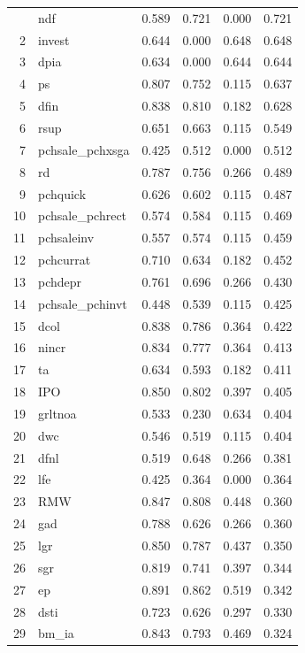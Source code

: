 \begin{footnotesize}
\begin{longtable}{rl|c|c|c|c}
		
		\hline\hline
		\endfoot
		1 & ndf & 0.589 & 0.721 & 0.000 & 0.721 \\ 
		2 & invest & 0.644 & 0.000 & 0.648 & 0.648 \\ 
		3 & dpia & 0.634 & 0.000 & 0.644 & 0.644 \\ 
		4 & ps & 0.807 & 0.752 & 0.115 & 0.637 \\ 
		5 & dfin & 0.838 & 0.810 & 0.182 & 0.628 \\ 
		6 & rsup & 0.651 & 0.663 & 0.115 & 0.549 \\ 
		7 & pchsale\_pchxsga & 0.425 & 0.512 & 0.000 & 0.512 \\ 
		8 & rd & 0.787 & 0.756 & 0.266 & 0.489 \\ 
		9 & pchquick & 0.626 & 0.602 & 0.115 & 0.487 \\ 
		10 & pchsale\_pchrect & 0.574 & 0.584 & 0.115 & 0.469 \\ 
		11 & pchsaleinv & 0.557 & 0.574 & 0.115 & 0.459 \\ 
		12 & pchcurrat & 0.710 & 0.634 & 0.182 & 0.452 \\ 
		13 & pchdepr & 0.761 & 0.696 & 0.266 & 0.430 \\ 
		14 & pchsale\_pchinvt & 0.448 & 0.539 & 0.115 & 0.425 \\ 
		15 & dcol & 0.838 & 0.786 & 0.364 & 0.422 \\ 
		16 & nincr & 0.834 & 0.777 & 0.364 & 0.413 \\ 
		17 & ta & 0.634 & 0.593 & 0.182 & 0.411 \\ 
		18 & IPO & 0.850 & 0.802 & 0.397 & 0.405 \\ 
		19 & grltnoa & 0.533 & 0.230 & 0.634 & 0.404 \\ 
		20 & dwc & 0.546 & 0.519 & 0.115 & 0.404 \\ 
		21 & dfnl & 0.519 & 0.648 & 0.266 & 0.381 \\ 
		22 & lfe & 0.425 & 0.364 & 0.000 & 0.364 \\ 
		23 & RMW & 0.847 & 0.808 & 0.448 & 0.360 \\ 
		24 & gad & 0.788 & 0.626 & 0.266 & 0.360 \\ 
		25 & lgr & 0.850 & 0.787 & 0.437 & 0.350 \\ 
		26 & sgr & 0.819 & 0.741 & 0.397 & 0.344 \\ 
		27 & ep & 0.891 & 0.862 & 0.519 & 0.342 \\ 
		28 & dsti & 0.723 & 0.626 & 0.297 & 0.330 \\ 
		29 & bm\_ia & 0.843 & 0.793 & 0.469 & 0.324 \\ 

\end{longtable}
\end{footnotesize}
